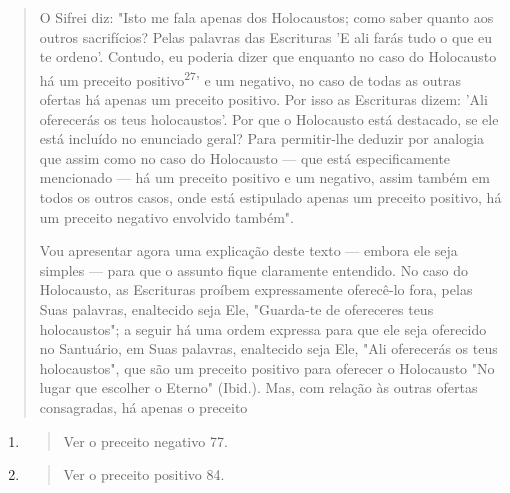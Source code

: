 \begin{quote}
O Sifrei diz: "Isto me fala apenas dos Holocaustos; como saber quanto
aos outros sacrifícios? Pelas palavras das Escrituras 'E ali farás tudo
o que eu te ordeno'. Contudo, eu poderia dizer que enquanto no caso do
Holocausto há um preceito positivo\textsuperscript{27}' e um negativo,
no caso de todas as outras ofertas há apenas um preceito positivo. Por
isso as Escrituras dizem: 'Ali oferecerás os teus holocaustos'. Por que
o Holocausto está destacado, se ele está incluído no enunciado geral?
Para permitir-lhe deduzir por analogia que assim como no ca­so do
Holocausto --- que está especificamente mencionado --- há um preceito
positivo e um negativo, assim também em todos os outros casos, onde está
es­tipulado apenas um preceito positivo, há um preceito negativo
envolvido também".

Vou apresentar agora uma explicação deste texto --- embora ele seja
simples --- para que o assunto fique claramente entendido. No caso do
Holo­causto, as Escrituras proíbem expressamente oferecê-lo fora, pelas
Suas pala­vras, enaltecido seja Ele, "Guarda-te de ofereceres teus
holocaustos"; a seguir há uma ordem expressa para que ele seja oferecido
no Santuário, em Suas pala­vras, enaltecido seja Ele, "Ali oferecerás os
teus holocaustos", que são um pre­ceito positivo para oferecer o
Holocausto "No lugar que escolher o Eterno" (Ibid.). Mas, com relação às
outras ofertas consagradas, há apenas o preceito
\end{quote}

\begin{enumerate}
\def\labelenumi{\arabic{enumi}.}
\setcounter{enumi}{269}
\item
  \begin{quote}
  Ver o preceito negativo 77.
  \end{quote}
\item
  \begin{quote}
  Ver o preceito positivo 84.
  \end{quote}
\end{enumerate}

